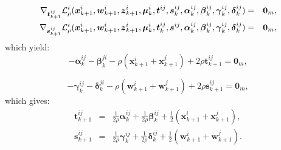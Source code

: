 \documentclass[11pt,a4paper]{article}
\theoremstyle{plain}
\theoremstyle{definition}
\theoremstyle{remark}
\begin{document}
	\begin{eqnarray*}
		\nabla_{\boldsymbol{t}_{k+1}^{ij}} \mathcal{L}_{\rho}^i(\boldsymbol{x}%
		_{k+1}^i, \boldsymbol{w}_{k+1}^i, \boldsymbol{z}_{k+1}^i, \boldsymbol{\mu}%
		_k^i, \boldsymbol{t}^{ij}, \boldsymbol{s}_k^{ij}, \boldsymbol{\alpha}%
		_k^{ij}, \boldsymbol{\beta}_k^{ij}, \boldsymbol{\gamma}_k^{ij}, \boldsymbol{%
			\delta}_k^{ij}) &=& \boldsymbol{0}_m, \\
		\nabla_{\boldsymbol{s}_{k+1}^{ij}} \mathcal{L}_{\rho}^i(\boldsymbol{x}%
		_{k+1}^i, \boldsymbol{w}_{k+1}^i, \boldsymbol{z}_{k+1}^i, \boldsymbol{\mu}%
		_k^i, \boldsymbol{t}_k^{ij}, \boldsymbol{s}^{ij}, \boldsymbol{\alpha}%
		_k^{ij}, \boldsymbol{\beta}_k^{ij}, \boldsymbol{\gamma}_k^{ij}, \boldsymbol{%
			\delta}_k^{ij}) &=&  \boldsymbol{0}_m,
	\end{eqnarray*}
	which yield:
	\begin{equation*}
		- \boldsymbol{\alpha}_k^{ij}- \boldsymbol{\beta}_k^{ji} -
		\rho (\boldsymbol{x}_{k+1}^i + \boldsymbol{x}_{k+1}^j) + 2 \rho \boldsymbol{t%
		}_{k+1}^{ij} = \boldsymbol{0}_m,
	\end{equation*}
	
	\begin{equation*}
		- \boldsymbol{\gamma}_k^{ij} - \boldsymbol{\delta}_k^{ji}
		- \rho (\boldsymbol{w}_{k+1}^i + \boldsymbol{w}_{k+1}^j) + 2 \rho 
		\boldsymbol{s}_{k+1}^{ij} = \boldsymbol{0}_m,
	\end{equation*}
	which gives:	
	\begin{subequations}
		\begin{eqnarray}
			\boldsymbol{t}_{k+1}^{ij} &=& \frac{1}{2 \rho} \boldsymbol{\alpha}_k^{ij} + \frac{1}{2 \rho} \boldsymbol{\beta}_k^{ij} + 
			\frac{1}{2} \left( \boldsymbol{x}_{k+1}^i + \boldsymbol{x}_{k+1}^j \right), \label{sub1} \\
			\boldsymbol{s}_{k+1}^{ij} &=& \frac{1}{2 \rho} \boldsymbol{\gamma}_k^{ij} + \frac{1}{2 \rho} \boldsymbol{\delta}_k^{ij} + 
			\frac{1}{2} \left( \boldsymbol{w}_{k+1}^i + \boldsymbol{w}_{k+1}^j \right). \label{sub2}
		\end{eqnarray}
	\end{subequations}
	
\end{document}
